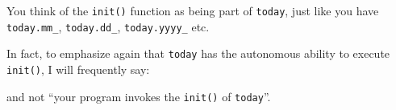 You think of the \texttt{init()} function as being part of \texttt{today}, just like you
have \texttt{today.mm\_}, \texttt{today.dd\_}, \texttt{today.yyyy\_} etc.

In fact, to emphasize again that \texttt{today} has the autonomous ability
to execute \texttt{init()}, I will frequently say:


and not ``your program invokes the \texttt{init()} of \texttt{today}''.







